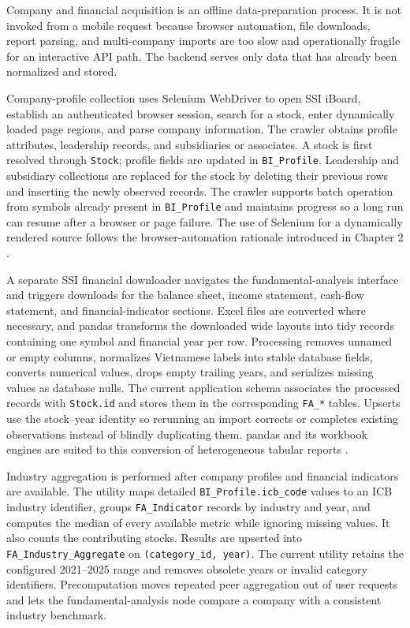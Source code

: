 Company and financial acquisition is an offline data-preparation process. It is not invoked from a mobile request because browser automation, file downloads, report parsing, and multi-company imports are too slow and operationally fragile for an interactive API path. The backend serves only data that has already been normalized and stored.

Company-profile collection uses Selenium WebDriver to open SSI iBoard, establish an authenticated browser session, search for a stock, enter dynamically loaded page regions, and parse company information. The crawler obtains profile attributes, leadership records, and subsidiaries or associates. A stock is first resolved through \texttt{Stock}; profile fields are updated in \texttt{BI\_Profile}. Leadership and subsidiary collections are replaced for the stock by deleting their previous rows and inserting the newly observed records. The crawler supports batch operation from symbols already present in \texttt{BI\_Profile} and maintains progress so a long run can resume after a browser or page failure. The use of Selenium for a dynamically rendered source follows the browser-automation rationale introduced in Chapter 2 \cite{seleniumWebDriver2025}.

A separate SSI financial downloader navigates the fundamental-analysis interface and triggers downloads for the balance sheet, income statement, cash-flow statement, and financial-indicator sections. Excel files are converted where necessary, and pandas transforms the downloaded wide layouts into tidy records containing one symbol and financial year per row. Processing removes unnamed or empty columns, normalizes Vietnamese labels into stable database fields, converts numerical values, drops empty trailing years, and serializes missing values as database nulls. The current application schema associates the processed records with \texttt{Stock.id} and stores them in the corresponding \texttt{FA\_*} tables. Upserts use the stock--year identity so rerunning an import corrects or completes existing observations instead of blindly duplicating them. pandas and its workbook engines are suited to this conversion of heterogeneous tabular reports \cite{pandasIO2026}.

Industry aggregation is performed after company profiles and financial indicators are available. The utility maps detailed \texttt{BI\_Profile.icb\_code} values to an ICB industry identifier, groups \texttt{FA\_Indicator} records by industry and year, and computes the median of every available metric while ignoring missing values. It also counts the contributing stocks. Results are upserted into \texttt{FA\_Industry\_Aggregate} on \texttt{(category\_id, year)}. The current utility retains the configured 2021--2025 range and removes obsolete years or invalid category identifiers. Precomputation moves repeated peer aggregation out of user requests and lets the fundamental-analysis node compare a company with a consistent industry benchmark.

